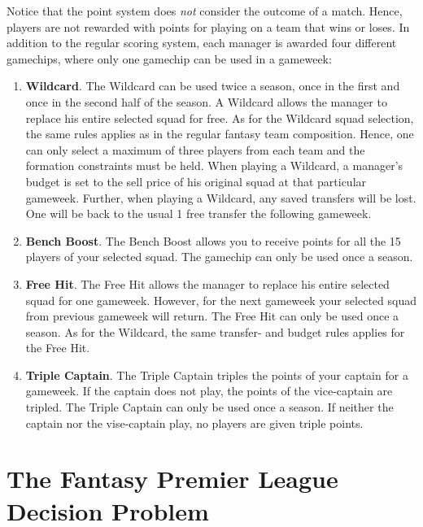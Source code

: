 Notice that the point system does \textit{not} consider the outcome of a match. Hence, players are not rewarded with points for playing on a team that wins or loses. In addition to the regular scoring system, each manager is awarded four different gamechips, where only one gamechip can be used in a gameweek: 
\begin{enumerate} [label=(\roman*)]

\item \textbf{Wildcard}. The Wildcard can be used twice a season, once in the first and once in the second half of the season. A Wildcard allows the manager to replace his entire selected squad for free. As for the Wildcard squad selection, the same rules applies as in the regular fantasy team composition. Hence, one can only select a maximum of three players from each team and the formation constraints must be held. When playing a Wildcard, a manager's budget is set to the sell price of his original squad at that particular gameweek. Further, when playing a Wildcard, any saved transfers will be lost. One will be back to the usual 1 free transfer the following gameweek.

\item \textbf{Bench Boost}. The Bench Boost allows you to receive points for all the 15 players of your selected squad. The gamechip can only be used once a season. 

\item \textbf{Free Hit}. The Free Hit allows the manager to replace his entire selected squad for one gameweek. However, for the next gameweek your selected squad from previous gameweek will return. The Free Hit can only be used once a season. As for the Wildcard, the same transfer- and budget rules applies for the Free Hit.

\item \textbf{Triple Captain}. The Triple Captain triples the points of your captain for a gameweek. If the captain does not play, the points of the vice-captain are tripled. The Triple Captain can only be used once a season. If neither the captain nor the vise-captain play, no players are given triple points.
\end{enumerate}

\section{The Fantasy Premier League Decision Problem} \label{section_prob_desc_fpldp}

